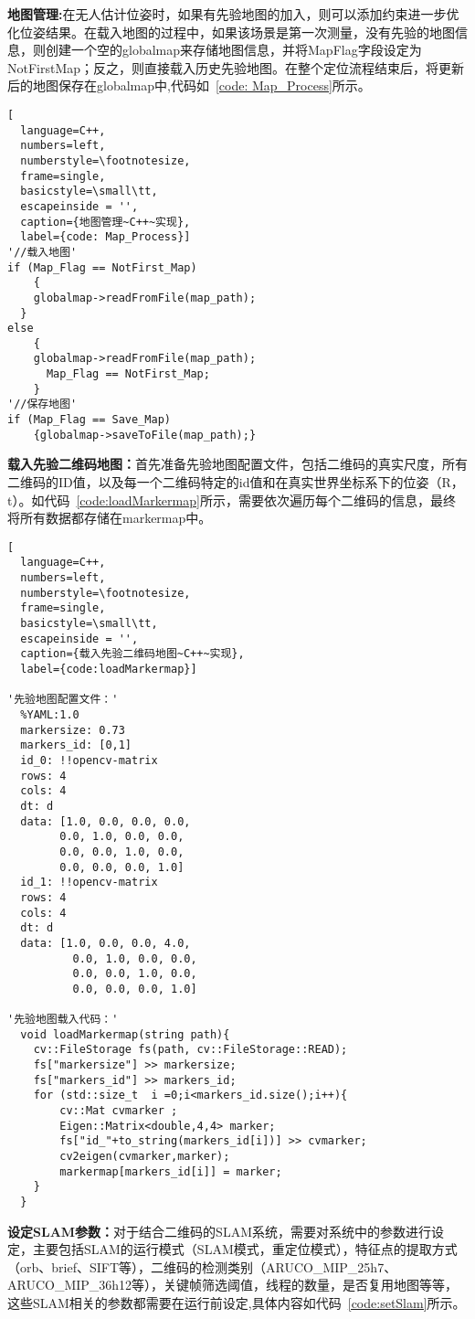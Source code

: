 \textbf{地图管理:}在无人估计位姿时，如果有先验地图的加入，则可以添加约束进一步优化位姿结果。在载入地图的过程中，如果该场景是第一次测量，没有先验的地图信息，则创建一个空的globalmap来存储地图信息，并将MapFlag字段设定为NotFirstMap；反之，则直接载入历史先验地图。在整个定位流程结束后，将更新后的地图保存在globalmap中,代码如~\ref{code: Map_Process}所示。
\begin{lstlisting}[
  language=C++,
  numbers=left,                
  numberstyle=\footnotesize,
  frame=single,     
  basicstyle=\small\tt,    
  escapeinside = '',
  caption={地图管理~C++~实现},
  label={code: Map_Process}]
'//载入地图'
if (Map_Flag == NotFirst_Map) 
	{
    globalmap->readFromFile(map_path);
  }
else
	{
    globalmap->readFromFile(map_path);
	  Map_Flag == NotFirst_Map;
	}
'//保存地图'
if (Map_Flag == Save_Map) 
    {globalmap->saveToFile(map_path);}
\end{lstlisting}
\textbf{载入先验二维码地图：}首先准备先验地图配置文件，包括二维码的真实尺度，所有二维码的ID值，以及每一个二维码特定的id值和在真实世界坐标系下的位姿（R，t）。如代码~\ref{code:loadMarkermap}所示，需要依次遍历每个二维码的信息，最终将所有数据都存储在markermap中。
\begin{lstlisting}[
  language=C++,
  numbers=left,                
  numberstyle=\footnotesize,
  frame=single,     
  basicstyle=\small\tt,    
  escapeinside = '',
  caption={载入先验二维码地图~C++~实现},
  label={code:loadMarkermap}]

'先验地图配置文件：'
  %YAML:1.0
  markersize: 0.73
  markers_id: [0,1]
  id_0: !!opencv-matrix
  rows: 4
  cols: 4
  dt: d
  data: [1.0, 0.0, 0.0, 0.0, 
        0.0, 1.0, 0.0, 0.0,  
        0.0, 0.0, 1.0, 0.0, 
        0.0, 0.0, 0.0, 1.0]
  id_1: !!opencv-matrix
  rows: 4
  cols: 4
  dt: d
  data: [1.0, 0.0, 0.0, 4.0, 
          0.0, 1.0, 0.0, 0.0,  
          0.0, 0.0, 1.0, 0.0, 
          0.0, 0.0, 0.0, 1.0]

'先验地图载入代码：'
  void loadMarkermap(string path){
    cv::FileStorage fs(path, cv::FileStorage::READ);
    fs["markersize"] >> markersize;
    fs["markers_id"] >> markers_id;
    for (std::size_t  i =0;i<markers_id.size();i++){
        cv::Mat cvmarker ;
        Eigen::Matrix<double,4,4> marker;
        fs["id_"+to_string(markers_id[i])] >> cvmarker;
        cv2eigen(cvmarker,marker);
        markermap[markers_id[i]] = marker;
    }
  }
\end{lstlisting}
\textbf{设定SLAM参数：}对于结合二维码的SLAM系统，需要对系统中的参数进行设定，主要包括SLAM的运行模式（SLAM模式，重定位模式），特征点的提取方式（orb、brief、SIFT等），二维码的检测类别（ARUCO\_MIP\_25h7、ARUCO\_MIP\_36h12等），关键帧筛选阈值，线程的数量，是否复用地图等等，这些SLAM相关的参数都需要在运行前设定,具体内容如代码~\ref{code:setSlam}所示。
